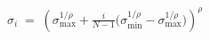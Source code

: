 \documentclass[border=10pt,varwidth=\maxdimen]{standalone}
\begin{document}
\(\displaystyle \sigma_i \;=\; \left(\sigma_{\max}^{1/\rho} + \frac{i}{N-1}\big(\sigma_{\min}^{1/\rho} - \sigma_{\max}^{1/\rho}\big)\right)^{\!\rho} \)
\end{document}
